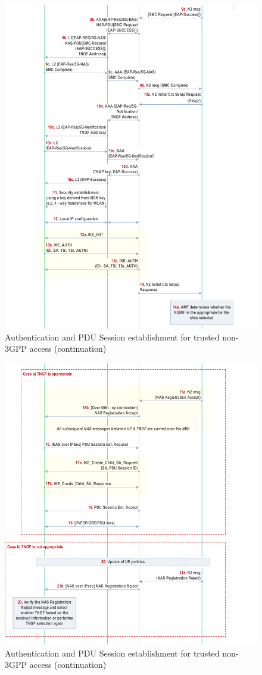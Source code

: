 \begin{figure}
    \centering
    \includegraphics[width=0.75\linewidth]{figs/Authentication and PDU Session establishment for trusted non-3GPP access_2.png}
    \caption{Authentication and PDU Session establishment for trusted non-3GPP access (continuation)}
    \label{fig:Authentication and PDU Session establishment for trusted non-3GPP access_2}
\end{figure}

\begin{figure}
    \centering
    \includegraphics[width=0.75\linewidth]{figs/Authentication and PDU Session establishment for trusted non-3GPP access_3.png}
    \caption{Authentication and PDU Session establishment for trusted non-3GPP access (continuation)}
    \label{fig:Authentication and PDU Session establishment for trusted non-3GPP access_3}
\end{figure}

